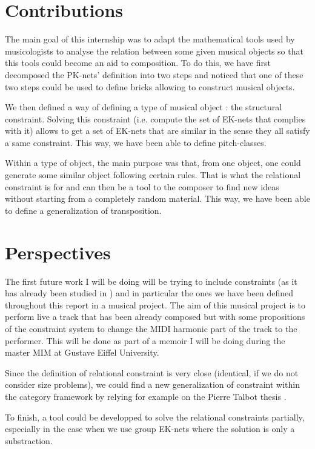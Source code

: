 \section{Contributions}
The main goal of this internship was to adapt the mathematical tools used by musicologists to analyse the relation between some given musical objects so that this tools could become an aid to composition. To do this, we have first decomposed the PK-nets' definition into two steps and noticed that one of these two steps could be used to define bricks allowing to construct musical objects.

We then defined a way of defining a type of musical object : the structural constraint. Solving this constraint (i.e. compute the set of EK-nets that complies with it) allows to get a set of EK-nets that are similar in the sense they all satisfy a same constraint. This way, we have been able to define pitch-classes.%

Within a type of object, the main purpose was that, from one object, one could generate some similar object following certain rules. That is what the relational constraint is for and can then be a tool to the composer to find new ideas without starting from a completely random material. This way, we have been able to define a generalization of transposition. %

\section{Perspectives}

The first future work I will be doing will be trying to include constraints (as it has already been studied in \cite{talbot2017interactive}) and in particular the ones we have been defined throughout this report in a musical project.  The aim of this musical project is to perform live a track that has been already composed but with some propositions of the constraint system to change the MIDI harmonic part of the track to the performer. This will be done as part of a memoir I will be doing during the master MIM at Gustave Eiffel University.

Since the definition of relational constraint is very close (identical, if we do not consider size problems), we could find a new generalization of constraint within the category framework by relying for example on the Pierre Talbot thesis \cite{talbot2018spacetime}.

To finish, a tool could be developped to solve the relational constraints partially, especially in the case when we use group EK-nets where the solution is only a substraction.